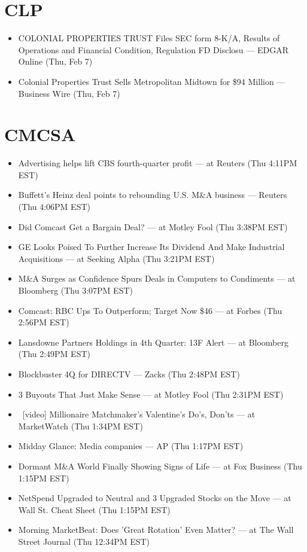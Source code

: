 \documentclass[11pt,asymmetric]{article}
\begin{document}
\section*{CLP}
\begin{itemize}
\item COLONIAL PROPERTIES TRUST Files SEC form 8-K/A, Results of Operations and Financial Condition, Regulation FD Disclosu --- EDGAR Online (Thu, Feb 7)
\item Colonial Properties Trust Sells Metropolitan Midtown for \$94 Million --- Business Wire (Thu, Feb 7)
\end{itemize}

\section*{CMCSA}
\begin{itemize}
\item Advertising helps lift CBS fourth-quarter profit --- at Reuters (Thu 4:11PM EST)
\item Buffett's Heinz deal points to rebounding U.S. M\&A business --- Reuters (Thu 4:06PM EST)
\item Did Comcast Get a Bargain Deal? --- at Motley Fool (Thu 3:38PM EST)
\item GE Looks Poised To Further Increase Its Dividend And Make Industrial Acquisitions --- at Seeking Alpha (Thu 3:21PM EST)
\item M\&A Surges as Confidence Spurs Deals in Computers to Condiments --- at Bloomberg (Thu 3:07PM EST)
\item Comcast: RBC Ups To Outperform; Target Now \$46 --- at Forbes (Thu 2:56PM EST)
\item Lansdowne Partners Holdings in 4th Quarter: 13F Alert --- at Bloomberg (Thu 2:49PM EST)
\item Blockbuster 4Q for DIRECTV --- Zacks (Thu 2:48PM EST)
\item 3 Buyouts That Just Make Sense --- at Motley Fool (Thu 2:31PM EST)
\item\ [video] Millionaire Matchmaker's Valentine's Do's, Don'ts --- at MarketWatch (Thu 1:34PM EST)
\item Midday Glance: Media companies --- AP (Thu 1:17PM EST)
\item Dormant M\&A World Finally Showing Signs of Life --- at Fox Business (Thu 1:15PM EST)
\item NetSpend Upgraded to Neutral and 3 Upgraded Stocks on the Move --- at Wall St. Cheat Sheet (Thu 1:15PM EST)
\item Morning MarketBeat: Does 'Great Rotation' Even Matter? --- at The Wall Street Journal (Thu 12:34PM EST)

\end{itemize}
\end{document}
